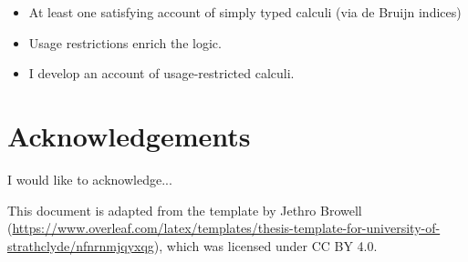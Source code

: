 \documentclass[a4paper,oneside,11pt]{book}
\theoremstyle{definition}
\begin{document}
\begin{itemize}
  \item At least one satisfying account of simply typed calculi
    (via de Bruijn indices)
  \item Usage restrictions enrich the logic.
  \item I develop an account of usage-restricted calculi.
\end{itemize}


\tableofcontents

\listoffigures

\listoftables



\chapter{Acknowledgements}
I would like to acknowledge...

This document is adapted from the template by Jethro Browell
(\url{https://www.overleaf.com/latex/templates/thesis-template-for-university-of-strathclyde/nfnrnmjqyxqg}),
which was licensed under CC BY 4.0.



\mainmatter



%




%
%







\end{document}
